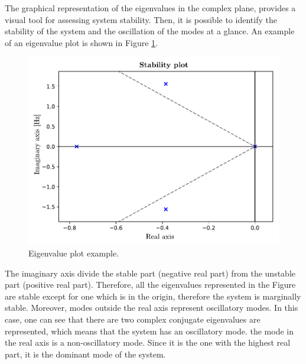 The graphical representation of the eigenvalues in the complex plane, provides a visual tool for assessing system stability. Then, it is possible to identify
the stability of the system and the oscillation of the modes at a glance. An example of an eigenvalue plot is shown in Figure \ref{fig:eigenvalues_plot_example}.

\begin{figure}[H]
  \centering
  \includegraphics[width=0.8\linewidth]{inkscape_svg/eigenvalues_plot_example.pdf}
  \caption{Eigenvalue plot example.}
  \label{fig:eigenvalues_plot_example}
\end{figure}

The imaginary axis divide the stable part (negative real part) from the unstable part (positive real part). Therefore, all the eigenvalues
represented in the Figure are stable except for one which is in the origin, therefore the system is marginally stable. Moreover, modes outside
the real axis represent oscillatory modes. In this case, one can see that there are
two complex conjugate eigenvalues are represented, which means that the system has an oscillatory mode. the mode in the real axis is a non-oscillatory mode.
Since it is the one with the highest real part, it is the dominant mode of the system.


